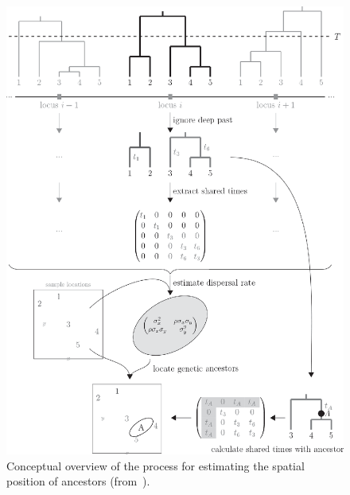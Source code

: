 \begin{figure}
  \begin{center}
    \includegraphics[width=14cm]{sparg-overview.eps}
  \end{center}
  \caption{Conceptual overview of the process for estimating the
    spatial position of ancestors
    (from~\cite{Osmond-Coop-2021}).}\label{fig:sparg-overview} 
\end{figure}

